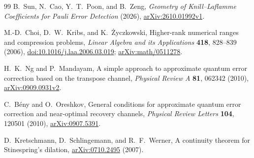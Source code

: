 \documentclass[11pt]{article}
\theoremstyle{remark}
\numberwithin{equation}{section}
\begin{document}
\begin{thebibliography}{99}
B.~Sun, N.~Cao, Y.~T.~Poon, and B.~Zeng,
\emph{Geometry of Knill--Laflamme Coefficients for Pauli Error Detection}
(2026), \href{https://arxiv.org/abs/2610.01992v1}{arXiv:2610.01992v1}.

M.-D.~Choi, D.~W.~Kribs, and K.~\.{Z}yczkowski,
Higher-rank numerical ranges and compression problems,
\emph{Linear Algebra and its Applications} \textbf{418}, 828--839 (2006),
\href{https://doi.org/10.1016/j.laa.2006.03.019}{doi:10.1016/j.laa.2006.03.019};
\href{https://arxiv.org/abs/math/0511278}{arXiv:math/0511278}.

H.~K.~Ng and P.~Mandayam,
A simple approach to approximate quantum error correction based on the
transpose channel, \emph{Physical Review A} \textbf{81}, 062342 (2010),
\href{https://arxiv.org/abs/0909.0931v2}{arXiv:0909.0931v2}.

C.~B\'eny and O.~Oreshkov,
General conditions for approximate quantum error correction and near-optimal
recovery channels, \emph{Physical Review Letters} \textbf{104}, 120501 (2010),
\href{https://arxiv.org/abs/0907.5391}{arXiv:0907.5391}.

D.~Kretschmann, D.~Schlingemann, and R.~F.~Werner,
A continuity theorem for Stinespring's dilation,
\href{https://arxiv.org/abs/0710.2495}{arXiv:0710.2495} (2007).

\end{thebibliography}
\end{document}
